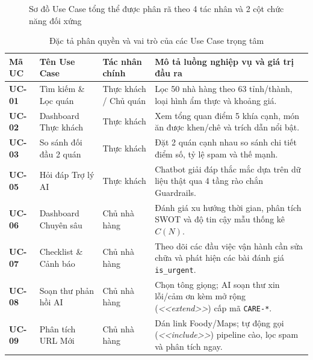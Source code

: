 \documentclass[12pt, a4paper]{article}
\begin{document}
\begin{figure}[H]
{%
}
\caption{Sơ đồ Use Case tổng thể được phân rã theo 4 tác nhân và 2 cột chức năng đối xứng}
\label{fig:usecase_diagram}
\end{figure}

\begin{table}[H]
\centering
\caption{Đặc tả phân quyền và vai trò của các Use Case trọng tâm}
\label{tab:usecase_spec}
\vspace{0.15cm}
\footnotesize
\begin{tabularx}{\textwidth}{l l l X}
\toprule
\rowcolor{blue!8}
\textbf{Mã UC} & \textbf{Tên Use Case} & \textbf{Tác nhân chính} & \textbf{Mô tả luồng nghiệp vụ và giá trị đầu ra} \\
\midrule
\textbf{UC-01} & Tìm kiếm \& Lọc quán & Thực khách / Chủ quán & Lọc 50 nhà hàng theo 63 tỉnh/thành, loại hình ẩm thực và khoảng giá. \\
\addlinespace
\textbf{UC-02} & Dashboard Thực khách & Thực khách & Xem tổng quan điểm 5 khía cạnh, món ăn được khen/chê và trích dẫn nổi bật. \\
\addlinespace
\textbf{UC-03} & So sánh đối đầu 2 quán & Thực khách & Đặt 2 quán cạnh nhau so sánh chi tiết điểm số, tỷ lệ spam và thế mạnh. \\
\addlinespace
\textbf{UC-05} & Hỏi đáp Trợ lý AI & Thực khách & Chatbot giải đáp thắc mắc dựa trên dữ liệu thật qua 4 tầng rào chắn Guardrails. \\
\addlinespace
\textbf{UC-06} & Dashboard Chuyên sâu & Chủ nhà hàng & Đánh giá xu hướng thời gian, phân tích SWOT và độ tin cậy mẫu thống kê $C(N)$. \\
\addlinespace
\textbf{UC-07} & Checklist \& Cảnh báo & Chủ nhà hàng & Theo dõi các đầu việc vận hành cần sửa chữa và phát hiện các bài đánh giá \texttt{is\_urgent}. \\
\addlinespace
\textbf{UC-08} & Soạn thư phản hồi AI & Chủ nhà hàng & Chọn tông giọng; AI soạn thư xin lỗi/cảm ơn kèm mở rộng (\textit{<<extend>>}) cấp mã \texttt{CARE-*}. \\
\addlinespace
\textbf{UC-09} & Phân tích URL Mới & Chủ nhà hàng & Dán link Foody/Maps; tự động gọi (\textit{<<include>>}) pipeline cào, lọc spam và phân tích ngay. \\
\bottomrule
\end{tabularx}
\end{table}
\end{document}
